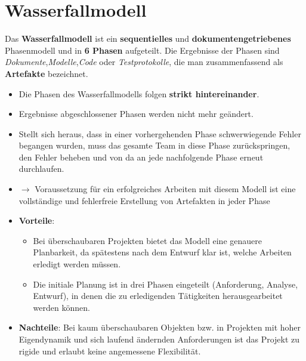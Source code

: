 \section{Wasserfallmodell}

\begin{tcolorbox}[title=Wasserfallmodell]
    Das \textbf{Wasserfallmodell} ist ein \textbf{sequentielles} und \textbf{dokumentengetriebenes} Phasenmodell und in \textbf{6 Phasen} aufgeteilt. Die Ergebnisse der Phasen sind \textit{Dokumente},\textit{Modelle},\textit{Code} oder \textit{Testprotokolle}, die man zusammenfassend als \textbf{Artefakte} bezeichnet.
    \begin{itemize}
        \item Die Phasen des Wasserfallmodells folgen \textbf{strikt hintereinander}.
        \item Ergebnisse abgeschlossener Phasen werden nicht mehr geändert.
        \item Stellt sich heraus, dass in einer vorhergehenden Phase schwerwiegende Fehler begangen wurden, muss das gesamte Team in diese Phase zurückspringen, den Fehler beheben und von da an jede nachfolgende Phase erneut durchlaufen.
        \item[] $\rightarrow$ Voraussetzung für ein erfolgreiches Arbeiten mit diesem Modell ist eine vollständige und fehlerfreie Erstellung von Artefakten in jeder Phase
        \item \textbf{Vorteile}:
        \begin{itemize}
            \item Bei überschaubaren Projekten bietet das Modell eine genauere Planbarkeit, da spätestens nach dem Entwurf klar ist, welche Arbeiten erledigt werden müssen.
            \item Die initiale Planung ist in drei Phasen eingeteilt (Anforderung, Analyse, Entwurf), in denen die zu erledigenden Tätigkeiten herausgearbeitet werden können.
        \end{itemize}
        \item \textbf{Nachteile}: Bei kaum überschaubaren Objekten bzw. in Projekten mit hoher Eigendynamik und sich laufend ändernden Anforderungen ist das Projekt zu rigide und erlaubt keine angemessene Flexibilität.
    \end{itemize}
\end{tcolorbox}

